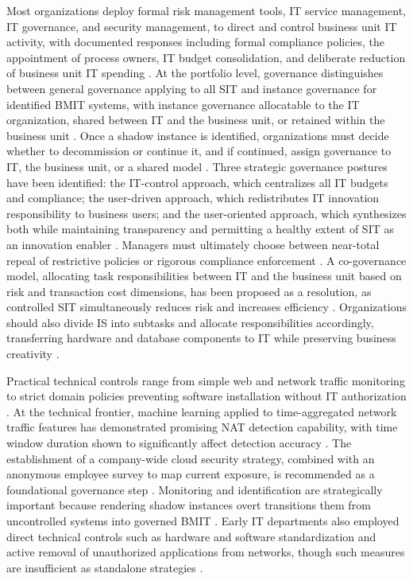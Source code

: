 \documentclass[12pt,oneside]{article}
\begin{document}
Most organizations deploy formal risk management tools, \ac{IT} service management, \ac{IT} governance, and security management, to direct and control business unit \ac{IT} activity, with documented responses including formal compliance policies, the appointment of process owners, \ac{IT} budget consolidation, and deliberate reduction of business unit \ac{IT} spending \citep[1, 7]{furstenau2016shadow}. At the portfolio level, governance distinguishes between general governance applying to all \ac{SIT} and instance governance for identified \ac{BMIT} systems, with instance governance allocatable to the \ac{IT} organization, shared between \ac{IT} and the business unit, or retained within the business unit \citep[17, 30]{klotz2019causing}. Once a shadow instance is identified, organizations must decide whether to decommission or continue it, and if continued, assign governance to \ac{IT}, the business unit, or a shared model \citep[3]{kopper2019shadowit}. Three strategic governance postures have been identified: the \ac{IT}-control approach, which centralizes all \ac{IT} budgets and compliance; the user-driven approach, which redistributes \ac{IT} innovation responsibility to business users; and the user-oriented approach, which synthesizes both while maintaining transparency and permitting a healthy extent of \ac{SIT} as an innovation enabler \citep[8-9]{gyoery2012exploring}. Managers must ultimately choose between near-total repeal of restrictive policies or rigorous compliance enforcement \citep[739]{haag2019acceptance}. A co-governance model, allocating task responsibilities between \ac{IT} and the business unit based on risk and transaction cost dimensions, has been proposed as a resolution, as controlled \ac{SIT} simultaneously reduces risk and increases efficiency \citep[9]{zimmermann2016governing}. Organizations should also divide IS into subtasks and allocate responsibilities accordingly, transferring hardware and database components to \ac{IT} while preserving business creativity \citep[5, 8]{kopper2018business}.

Practical technical controls range from simple web and network traffic monitoring to strict domain policies preventing software installation without \ac{IT} authorization \citep[278]{silic2014shadow}. At the technical frontier, machine learning applied to time-aggregated network traffic features has demonstrated promising NAT detection capability, with time window duration shown to significantly affect detection accuracy \citep[6]{nassar2021identifying}. The establishment of a company-wide cloud security strategy, combined with an anonymous employee survey to map current exposure, is recommended as a foundational governance step \citep[644]{walterbusch2017missing}. Monitoring and identification are strategically important because rendering shadow instances overt transitions them from uncontrolled systems into governed \ac{BMIT} \citep[29-30]{klotz2019causing}. Early \ac{IT} departments also employed direct technical controls such as hardware and software standardization and active removal of unauthorized applications from networks, though such measures are insufficient as standalone strategies \citep[9]{koch2014consumerization}.
\end{document}
